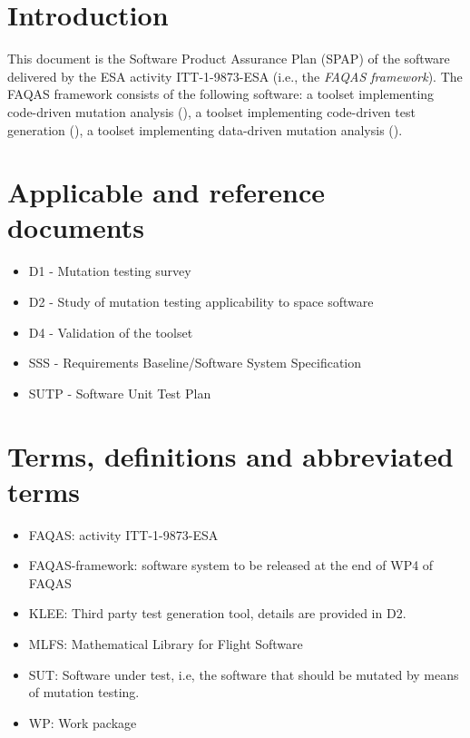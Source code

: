 
\chapter{Introduction}

This document is the Software Product Assurance Plan (SPAP) of the software delivered by the ESA activity ITT-1-9873-ESA (i.e., the \emph{FAQAS framework}).
The FAQAS framework consists of the following software: a toolset  implementing code-driven mutation analysis (\MASS), a toolset implementing code-driven test generation (\SEMUS), a toolset implementing data-driven mutation analysis (\DAMA).

\chapter{Applicable and reference documents}


\begin{itemize}
\item{D1 - Mutation testing survey}
\item{D2 - Study of mutation testing applicability to space software}
\item{D4 - Validation of the toolset}
\item{SSS - Requirements Baseline/Software System Specification}
\item{SUTP - Software Unit Test Plan}
\end{itemize}

\chapter{Terms, definitions and abbreviated terms}

\begin{itemize}
\item{FAQAS}: activity ITT-1-9873-ESA
\item{FAQAS-framework}: software system to be released at the end of WP4 of FAQAS
\item{KLEE}: Third party test generation tool, details are provided in D2.
\item{MLFS}: Mathematical Library for Flight Software
\item{SUT}: Software under test, i.e, the software that should be mutated by means of mutation testing.
\item{WP}: Work package

\end{itemize}

